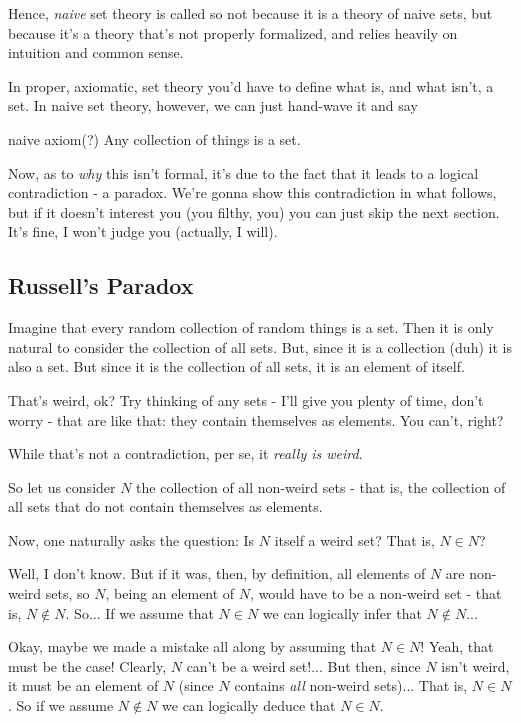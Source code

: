 Hence, \textit{naive} set theory is called so not because it is a theory of naive sets, but because it's a theory that's not properly formalized, and relies heavily on intuition and common sense.

In proper, axiomatic, set theory you'd have to define what is, and what isn't, a set. In naive set theory, however, we can just hand-wave it and say
\begin{blockenv}{naive axiom(?)}
	Any collection of things is a set.
\end{blockenv}

Now, as to \textit{why} this isn't formal, it's due to the fact that it leads to a logical contradiction - a paradox. We're gonna show this contradiction in what follows, but if it doesn't interest you (you filthy, you) you can just skip the next section. It's fine, I won't judge you (actually, I will).
\pagebreak
\subsection{Russell's Paradox}

Imagine that every random collection of random things is a set. Then it is only natural to consider the collection of all sets. But, since it is a collection (duh) it is also a set. But since it is the collection of all sets, it is an element of itself.

That's weird, ok? Try thinking of any sets - I'll give you plenty of time, don't worry - that are like that: they contain themselves as elements. You can't, right?

While that's not a contradiction, per se, it \textit{really is weird}.

So let us consider $N$ the collection of all non-weird sets - that is, the collection of all sets that do not contain themselves as elements.

Now, one naturally asks the question: Is $N$ itself a weird set? That is, $N\in N$?

Well, I don't know. But if it was, then, by definition, all elements of $N$ are non-weird sets, so $N$, being an element of $N$, would have to be a non-weird set - that is, $N\notin N$. So... If we assume that $N\in N$ we can logically infer that $N\notin N$...

Okay, maybe we made a mistake all along by assuming that $N\in N$! Yeah, that must be the case! Clearly, $N$ can't be a weird set!... But then, since $N$ isn't weird, it must be an element of $N$ (since $N$ contains \textit{all} non-weird sets)... That is, $N\in N$. So if we assume $N\notin N$ we can logically deduce that $N\in N$.

